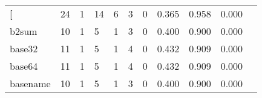 \begin{longtable}{lp{1.2cm}p{1.2cm}p{1.2cm}p{1.2cm}p{1.2cm}p{1.2cm}p{1.2cm}p{1.2cm}p{1.2cm}p{1.2cm}}
\bottomrule
\endlastfoot
{[}         &                                    24 &                                                  1 &                                                 14 &                                                  6 &                                                  3 &                                                  0 &                                              0.365 &                                              0.958 &                                              0.000 \\
b2sum     &                                    10 &                                                  1 &                                                  5 &                                                  1 &                                                  3 &                                                  0 &                                              0.400 &                                              0.900 &                                              0.000 \\
base32    &                                    11 &                                                  1 &                                                  5 &                                                  1 &                                                  4 &                                                  0 &                                              0.432 &                                              0.909 &                                              0.000 \\
base64    &                                    11 &                                                  1 &                                                  5 &                                                  1 &                                                  4 &                                                  0 &                                              0.432 &                                              0.909 &                                              0.000 \\
basename  &                                    10 &                                                  1 &                                                  5 &                                                  1 &                                                  3 &                                                  0 &                                              0.400 &                                              0.900 &                                              0.000 \\

\end{longtable}
